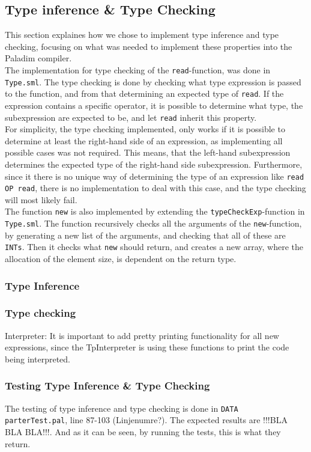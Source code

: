 \documentclass[10pt]{article}
\begin{document}
\subsection{Type inference \& Type Checking}
This section explaines how we chose to implement type inference and type checking, focusing on what was needed to implement these properties into the Paladim compiler.\\
The implementation for type checking of the \texttt{read}-function, was done in \texttt{Type.sml}. The type checking is done by checking what type expression is passed to the function, and from that determining an expected type of \texttt{read}. If the expression contains a specific operator, it is possible to determine what type, the subexpression are expected to be, and let \texttt{read} inherit this property.\\
For simplicity, the type checking implemented, only works if it is possible to determine at least the right-hand side of an expression, as implementing all possible cases was not required. This means, that the left-hand subexpression determines the expected type of the right-hand side subexpression. Furthermore, since it there is no unique way of determining the type of an expression like \texttt{read OP read}, there is no implementation to deal with this case, and the type checking will most likely fail.\\
The function \texttt{new} is also implemented by extending the \texttt{typeCheckExp}-function in \texttt{Type.sml}. The function recursively checks all the arguments of the \texttt{new}-function, by generating a new list of the arguments, and checking that all of these are \texttt{INTs}. Then it checks what \texttt{new} should return, and creates a new array, where the allocation of the element size, is dependent on the return type.
\subsubsection{Type Inference}
\subsubsection{Type checking}

Interpreter:
It is important to add pretty printing functionality for all new expressions, since the TpInterpreter is using these functions to print the code being interpreted.
\subsubsection{Testing Type Inference \& Type Checking}
The testing of type inference and type checking is done in \texttt{DATA\\parterTest.pal}, line 87-103 (Linjenumre?). The expected results are !!!BLA BLA BLA!!!. And as it can be seen, by running the tests, this is what they return.
\end{document}
